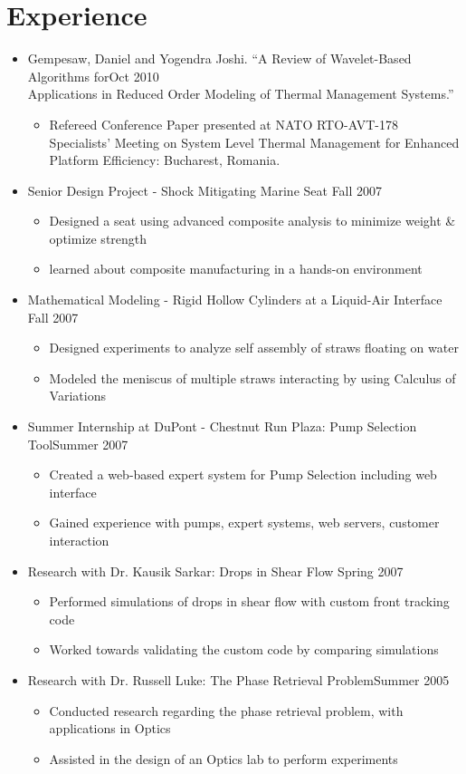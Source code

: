 \documentclass[10pt]{article}
\newenvironment{myitem}{
\begin{itemize}
  \setlength{\itemsep}{1pt}
  \setlength{\parskip}{0pt}
  \setlength{\parsep}{0pt}
}{\end{itemize}}
\begin{document}
\section{Experience}
\vspace{-0.25cm}
\begin{myitem}
\item Gempesaw, Daniel and Yogendra Joshi. ``A Review of Wavelet-Based Algorithms for\hfill Oct 2010\\ 
Applications in Reduced Order Modeling of Thermal Management Systems.''
\begin{myitem}
\item Refereed Conference Paper presented at NATO RTO-AVT-178 Specialists' Meeting on System Level Thermal Management for Enhanced Platform Efficiency: Bucharest, Romania. 
\end{myitem}%
\item Senior Design Project - Shock Mitigating Marine Seat \hfill Fall 2007
\begin{myitem}
  \item Designed a seat using advanced composite analysis to minimize weight \& optimize strength
  \item learned about composite manufacturing in a hands-on environment
\end{myitem}
%
\item Mathematical Modeling - Rigid Hollow Cylinders at a Liquid-Air Interface \hfill Fall 2007
\begin{myitem}
su  \item Designed experiments to analyze self assembly of straws floating on water
  \item Modeled the meniscus of multiple straws interacting by using Calculus of Variations
\end{myitem}
%
\item Summer Internship at DuPont - Chestnut Run Plaza: Pump Selection Tool\hfill Summer 2007
 \begin{myitem}
  \item Created a web-based expert system for Pump Selection including web interface
  \item Gained experience with pumps, expert systems, web servers, customer interaction
 \end{myitem}
%
\item Research with Dr. Kausik Sarkar: Drops in Shear Flow \hfill Spring 2007
 \begin{myitem}
  \item Performed simulations of drops in shear flow with custom front tracking code
  \item Worked towards validating the custom code by comparing simulations
 \end{myitem}
%
\item Research with Dr. Russell Luke: The Phase Retrieval Problem\hfill Summer 2005
 \begin{myitem}
  \item Conducted research regarding the phase retrieval problem, with applications in Optics
  \item Assisted in the design of an Optics lab to perform experiments
 \end{myitem}
\end{myitem}
\end{document}
